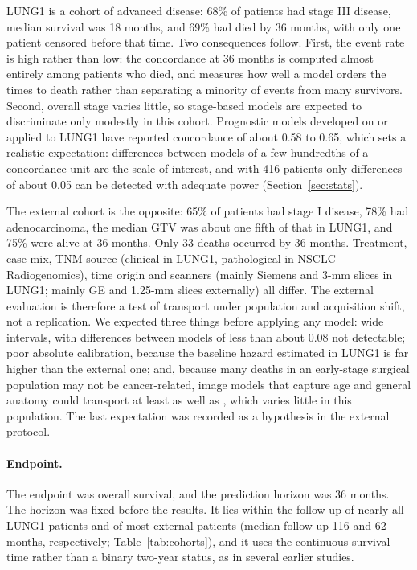 

LUNG1 is a cohort of advanced disease: 68\% of patients had stage III disease, median survival was 18 months, and 69\% had died by 36 months, with only one patient censored before that time. Two consequences follow. First, the event rate is high rather than low: the concordance at 36 months is computed almost entirely among patients who died, and measures how well a model orders the times to death rather than separating a minority of events from many survivors. Second, overall stage varies little, so stage-based models are expected to discriminate only modestly in this cohort. Prognostic models developed on or applied to LUNG1 have reported concordance of about 0.58 to 0.65,\cite{aerts2014} which sets a realistic expectation: differences between models of a few hundredths of a concordance unit are the scale of interest, and with 416 patients only differences of about 0.05 can be detected with adequate power (Section~\ref{sec:stats}).

The external cohort is the opposite: 65\% of patients had stage I disease, 78\% had adenocarcinoma, the median GTV was about one fifth of that in LUNG1, and 75\% were alive at 36 months. Only 33 deaths occurred by 36 months. Treatment, case mix, TNM source (clinical in LUNG1, pathological in NSCLC-Radiogenomics), time origin and scanners (mainly Siemens and 3-mm slices in LUNG1; mainly GE and 1.25-mm slices externally) all differ. The external evaluation is therefore a test of transport under population and acquisition shift, not a replication. We expected three things before applying any model: wide intervals, with differences between models of less than about 0.08 not detectable; poor absolute calibration, because the baseline hazard estimated in LUNG1 is far higher than the external one; and, because many deaths in an early-stage surgical population may not be cancer-related, image models that capture age and general anatomy could transport at least as well as , which varies little in this population. The last expectation was recorded as a hypothesis in the external protocol.

\paragraph{Endpoint.} The endpoint was overall survival, and the prediction horizon was 36 months. The horizon was fixed before the results. It lies within the follow-up of nearly all LUNG1 patients and of most external patients (median follow-up 116 and 62 months, respectively; Table~\ref{tab:cohorts}), and it uses the continuous survival time rather than a binary two-year status, as in several earlier studies.\cite{hosny2018,aerts2025tib}

